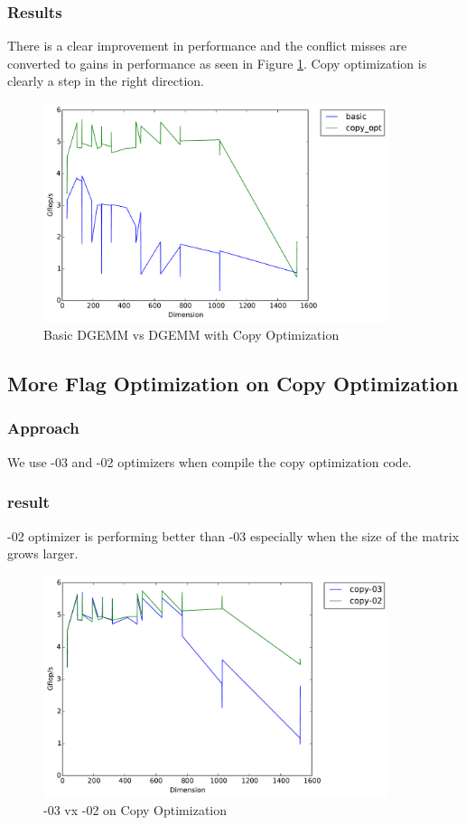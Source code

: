 \documentclass[11pt]{article}
\theoremstyle{plain}
\theoremstyle{definition}
\begin{document}
\subsubsection{Results}
There is a clear improvement in performance and the conflict misses are converted to gains in performance as seen in Figure \ref{basic_copy_opt}. Copy optimization is clearly a step in the right direction.
\begin{figure}[H]
    \includegraphics[width=0.9\textwidth]{timing_basic_vs_copy_opt.pdf}
    \caption{Basic DGEMM vs DGEMM with Copy Optimization}
    \label{basic_copy_opt}
\end{figure} 
\subsection{More Flag Optimization on Copy Optimization}
\subsubsection{Approach}
We use -03 and -02 optimizers when compile the copy optimization code.
\subsubsection{result}
-02 optimizer is performing better than -03 especially when the size of the matrix grows larger.
\begin{figure}[H]
    \includegraphics[width=0.9\textwidth]{timing_flag0203_copy.pdf}
    \caption{-03 vx -02 on Copy Optimization}
    \label{0203}
\end{figure}
 
\end{document}
